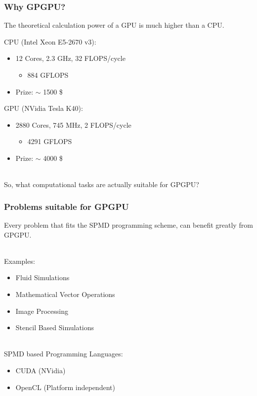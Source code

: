 \documentclass{beamer}
\begin{document}
\begin{frame}
    \frametitle{Why GPGPU?}

    The \alert{theoretical} calculation power of a GPU is much higher
    than a CPU.

    \begin{example}
        CPU (Intel Xeon E5-2670 v3):
        \begin{itemize}
            \item 12 Cores, 2.3 GHz, 32 FLOPS/cycle
            \begin{itemize}
                \item \alert{884 GFLOPS}
            \end{itemize}
            \item Prize: $\sim$ \alert{1500} \$
        \end{itemize}
        GPU (NVidia Tesla K40):
        \begin{itemize}
            \item 2880 Cores, 745 MHz, 2 FLOPS/cycle
            \begin{itemize}
                \item \alert{4291 GFLOPS}
            \end{itemize}
            \item Prize: $\sim$ \alert{4000} \$
        \end{itemize}
    \end{example}
    ~\\
    So, what computational tasks are actually suitable for GPGPU?
\end{frame}

\begin{frame}
    \frametitle{Problems suitable for GPGPU}
    Every problem that fits the \alert{SPMD} programming scheme, can benefit greatly
    from GPGPU.
    
    ~\\ 
    Examples:
    \begin{itemize}
        \item Fluid Simulations
        \item Mathematical Vector Operations
        \item Image Processing
        \item Stencil Based Simulations 
    \end{itemize}
    
    ~\\
    SPMD based Programming Languages:
    \begin{itemize}
        \item CUDA (NVidia)
        \item OpenCL (Platform independent)
    \end{itemize}
\end{frame}
\end{document}
